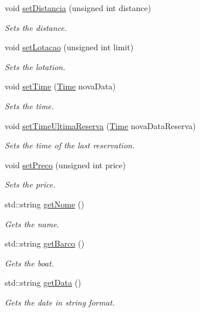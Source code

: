 \begin{DoxyCompactItemize}
void \hyperlink{classOferta_aecc4032aa7cb52bba09755f4654430b7}{set\+Distancia} (unsigned int distance)
\begin{DoxyCompactList}\small\item\em Sets the distance. \end{DoxyCompactList}\item 
void \hyperlink{classOferta_a8dd83eb9185287f796a48930c786eb96}{set\+Lotacao} (unsigned int limit)
\begin{DoxyCompactList}\small\item\em Sets the lotation. \end{DoxyCompactList}\item 
void \hyperlink{classOferta_a2e458f64440ac5ab862f27ac86b348fc}{set\+Time} (\hyperlink{classTime}{Time} nova\+Data)
\begin{DoxyCompactList}\small\item\em Sets the time. \end{DoxyCompactList}\item 
void \hyperlink{classOferta_a50c041d2301a351f2ac69ed235175116}{set\+Time\+Ultima\+Reserva} (\hyperlink{classTime}{Time} nova\+Data\+Reserva)
\begin{DoxyCompactList}\small\item\em Sets the time of the last reservation. \end{DoxyCompactList}\item 
void \hyperlink{classOferta_a900c1febcd11221d877bc7cce577dd18}{set\+Preco} (unsigned int price)
\begin{DoxyCompactList}\small\item\em Sets the price. \end{DoxyCompactList}\item 
std\+::string \hyperlink{classOferta_a16da38d9f369b000cb544c34200707b8}{get\+Nome} ()
\begin{DoxyCompactList}\small\item\em Gets the name. \end{DoxyCompactList}\item 
std\+::string \hyperlink{classOferta_aaed9b5937f9f33d2980fcc13ac02132c}{get\+Barco} ()
\begin{DoxyCompactList}\small\item\em Gets the boat. \end{DoxyCompactList}\item 
std\+::string \hyperlink{classOferta_a2b156b75371ad59af54ad96ad79c9d1e}{get\+Data} ()
\begin{DoxyCompactList}\small\item\em Gets the date in string format. \end{DoxyCompactList}\item 

\end{DoxyCompactItemize}
